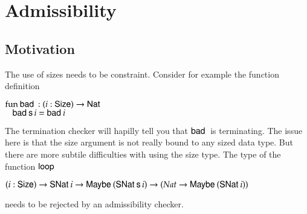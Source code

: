 \section{Admissibility}
\subsection{Motivation}
The use of sizes needs to be constraint.
Consider for example the function definition

\begin{bsp}
$\mathrm{fun}\: \mathsf{bad}\: : ( i : \mathsf{Size} ) \rightarrow{\mathsf{Nat}\:}$\\
$\hspace*{3mm} \mathsf{bad}\: \mathsf{s}\, i = \mathsf{bad}\: i $ 
\end{bsp}
The termination checker will hapilly tell you that $\mathsf{bad}\:$ is terminating.
The issue here is that the size argument is not really bound to any sized data type.
But there are more subtile difficulties with using the size type.
The type of the function $\mathsf{loop}\:$
\begin{bsp}
$( i : \mathsf{Size} ) \rightarrow{\mathsf{SNat}\:i \rightarrow\mathsf{Maybe}\:(\mathsf{SNat}\:\mathsf{s}\,i) \rightarrow(Nat \rightarrow\mathsf{Maybe}\:(\mathsf{SNat}\:i))} $ 
\end{bsp}
needs to be rejected by an admissibility checker.
